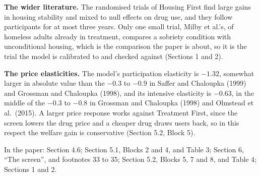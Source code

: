 \documentclass[11pt]{article}
\begin{document}
\begin{response}
\textbf{The wider literature.} The randomised trials of Housing First find large gains in
housing stability and mixed to null effects on drug use, and they follow participants for
at most three years. Only one small trial, Milby et al.'s, of homeless adults already in
treatment, compares a sobriety condition with unconditional housing, which is the comparison
the paper is about, so it is the trial the model is calibrated to and checked against
(Sections 1 and 2).

\textbf{The price elasticities.} The model's participation elasticity is $-1.32$, somewhat
larger in absolute value than the $-0.3$ to $-0.9$ in Saffer and Chaloupka (1999) and
Grossman and Chaloupka (1998), and its intensive elasticity is $-0.63$, in the middle of the
$-0.3$ to $-0.8$ in Grossman and Chaloupka (1998) and Olmstead et al.\ (2015). A larger
price response works against Treatment First, since the screen lowers the drug price and a
cheaper drug draws users back, so in this respect the welfare gain is conservative (Section
5.2, Block 5).

In the paper: Section 4.6; Section 5.1, Blocks 2 and 4, and Table 3; Section 6, ``The
screen'', and footnotes 33 to 35; Section 5.2, Blocks 5, 7 and 8, and Table 4; Sections 1
and 2.
\end{response}
\end{document}
